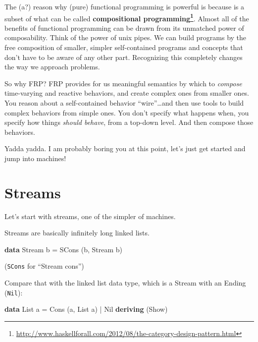 \documentclass[]{article}
\newenvironment{Shaded}{}{}
\newcommand{\KeywordTok}[1]{\textcolor[rgb]{0.00,0.44,0.13}{\textbf{{#1}}}}
\newcommand{\DataTypeTok}[1]{\textcolor[rgb]{0.56,0.13,0.00}{{#1}}}
\newcommand{\FunctionTok}[1]{\textcolor[rgb]{0.02,0.16,0.49}{{#1}}}
\newcommand{\NormalTok}[1]{{#1}}
\renewcommand{\href}[2]{#2\footnote{\url{#1}}}
\begin{document}
The (a?) reason why (pure) functional programming is powerful is because is a subset of what can be
called
\textbf{\href{http://www.haskellforall.com/2012/08/the-category-design-pattern.html}{compositional
programming}}. Almost all of the benefits of functional programming can be drawn from its unmatched
power of composability. Think of the power of unix pipes. We can build programs by the free
composition of smaller, simpler self-contained programs and concepts that don't have to be aware of
any other part. Recognizing this completely changes the way we approach problems.

So why FRP? FRP provides for us meaningful semantics by which to \emph{compose} time-varying and
reactive behaviors, and create complex ones from smaller ones. You reason about a self-contained
behavior ``wire''\ldots{}and then use tools to build complex behaviors from simple ones. You don't
specify what happens when, you specify how things \emph{should behave}, from a top-down level. And
then compose those behaviors.

Yadda yadda. I am probably boring you at this point, let's just get started and jump into machines!

\section{Streams}\label{streams}

Let's start with streams, one of the simpler of machines.

Streams are basically infinitely long linked lists.

\begin{Shaded}
\begin{Highlighting}[]
\KeywordTok{data} \DataTypeTok{Stream} \NormalTok{b }\FunctionTok{=} \DataTypeTok{SCons} \NormalTok{(b, }\DataTypeTok{Stream} \NormalTok{b)}
\end{Highlighting}
\end{Shaded}

(\texttt{SCons} for ``Stream cons'')

Compare that with the linked list data type, which is a Stream with an Ending (\texttt{Nil}):

\begin{Shaded}
\begin{Highlighting}[]
\KeywordTok{data} \DataTypeTok{List} \NormalTok{a }\FunctionTok{=} \DataTypeTok{Cons} \NormalTok{(a, }\DataTypeTok{List} \NormalTok{a) }\FunctionTok{|} \DataTypeTok{Nil}
  \KeywordTok{deriving} \NormalTok{(}\DataTypeTok{Show}\NormalTok{)}
\end{Highlighting}
\end{Shaded}
\end{document}
